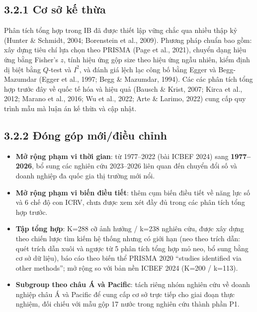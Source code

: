 \documentclass[
  a4paper,
  13pt]{extreport}
\providecommand{\tightlist}{%
  \setlength{\itemsep}{0pt}\setlength{\parskip}{0pt}}
\begin{document}
\hypertarget{cux1a1-sux1edf-kux1ebf-thux1eeba}{%
\subsection{3.2.1 Cơ sở kế
thừa}\label{cux1a1-sux1edf-kux1ebf-thux1eeba}}

Phân tích tổng hợp trong IB đã được thiết lập vững chắc qua nhiều thập
kỷ (Hunter \& Schmidt, 2004; Borenstein et al., 2009). Phương pháp chuẩn
bao gồm: xây dựng tiêu chí lựa chọn theo PRISMA (Page et al., 2021),
chuyển dạng hiệu ứng bằng Fisher's \(z\), tính hiệu ứng gộp size theo
hiệu ứng ngẫu nhiên, kiểm định dị biệt bằng \(Q\)-test và \(I^2\), và
đánh giá lệch lạc công bố bằng Egger và Begg-Mazumdar (Egger et al.,
1997; Begg \& Mazumdar, 1994). Các các phân tích tổng hợp trước đây về
quốc tế hóa và hiệu quả (Bausch \& Krist, 2007; Kirca et al., 2012;
Marano et al., 2016; Wu et al., 2022; Arte \& Larimo, 2022) cung cấp quy
trình mẫu mà luận án kế thừa và cập nhật.

\hypertarget{ux111uxf3ng-guxf3p-mux1edbiux111iux1ec1u-chux1ec9nh}{%
\subsection{3.2.2 Đóng góp mới/điều
chỉnh}\label{ux111uxf3ng-guxf3p-mux1edbiux111iux1ec1u-chux1ec9nh}}

\begin{itemize}
\tightlist
\item
  \textbf{Mở rộng phạm vi thời gian}: từ 1977--2022 (bài ICBEF 2024)
  sang \textbf{1977--2026}, bổ sung các nghiên cứu 2023--2026 liên quan
  đến chuyển đổi số và doanh nghiệp đa quốc gia thị trường mới nổi.
\item
  \textbf{Mở rộng phạm vi biến điều tiết}: thêm cụm biến điều tiết về
  năng lực số và 6 chế độ con ICRV, chưa được xem xét đầy đủ trong các
  phân tích tổng hợp trước.
\item
  \textbf{Tập tổng hợp}: K=288 cỡ ảnh hưởng / k=238 nghiên cứu, được xây
  dựng theo chiến lược tìm kiếm hệ thống nhưng có giới hạn (neo theo
  trích dẫn: quét trích dẫn xuôi và ngược từ 5 phân tích tổng hợp mỏ
  neo, bổ sung bằng cơ sở dữ liệu), báo cáo theo biến thể PRISMA 2020
  ``studies identified via other methods''; mở rộng so với bản nền ICBEF
  2024 (K=200 / k=113).
\item
  \textbf{Subgroup theo châu Á và Pacific}: tách riêng nhóm nghiên cứu
  về doanh nghiệp châu Á và Pacific để cung cấp cơ sở trực tiếp cho giai
  đoạn thực nghiệm, đối chiếu với mẫu gộp 17 nước trong nghiên cứu thành
  phần P1.
\end{itemize}
\end{document}
